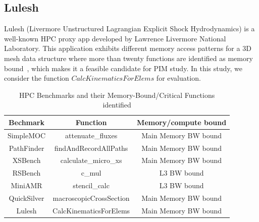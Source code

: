 \subsection{Lulesh}
Lulesh (Livermore Unstructured Lagrangian Explicit Shock Hydrodynamics) is a well-known HPC proxy app developed by Lawrence Livermore National Laboratory. This application exhibits different memory access patterns for a 3D mesh data structure where more than twenty functions are identified as memory bound~\cite{monil2022mapredict}, which makes it a feasible candidate for PIM study. In this study, we consider the function $CalcKinematicsForElems$ for evaluation.




%
%
\begin{table}[t]
\small
\caption{HPC Benchmarks and their Memory-Bound/Critical Functions identified}
\centering
    \begin{tabularx}{\columnwidth}{ccc}
\toprule
    Bechmark & Function & Memory/compute bound \\
\midrule

SimpleMOC & attenuate\_fluxes & Main Memory BW bound \\
PathFinder   & findAndRecordAllPaths & Main Memory BW bound \\
XSBench      & calculate\_micro\_xs & Main Memory BW bound \\
RSBench      & c\_mul & L3 BW bound \\
MiniAMR      & stencil\_calc & L3 BW bound \\
QuickSilver      & macroscopicCrossSection & Main Memory BW bound \\
Lulesh & CalcKinematicsForElems & Main Memory BW bound \\
\bottomrule
   \end{tabularx}
\label{table:apps}
\end{table}
%
%
%



